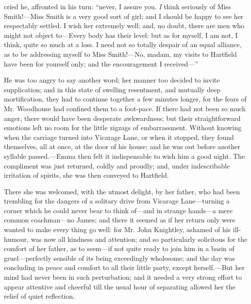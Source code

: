  cried he, affronted in his turn: “never, I assure you. {\em I} think seriously of Miss Smith!---Miss Smith is a very good sort of girl; and I should be happy to see her respectably settled. I wish her extremely well: and, no doubt, there are men who might not object to---Every body has their level: but as for myself, I am not, I think, quite so much at a loss. I need not so totally despair of an equal alliance, as to be addressing myself to Miss Smith!---No, madam, my visits to Hartfield have been for yourself only; and the encouragement I received---”


He was too angry to say another word; her manner too decided to invite supplication; and in this state of swelling resentment, and mutually deep mortification, they had to continue together a few minutes longer, for the fears of Mr. Woodhouse had confined them to a foot-pace. If there had not been so much anger, there would have been desperate awkwardness; but their straightforward emotions left no room for the little zigzags of embarrassment. Without knowing when the carriage turned into Vicarage Lane, or when it stopped, they found themselves, all at once, at the door of his house; and he was out before another syllable passed.---Emma then felt it indispensable to wish him a good night. The compliment was just returned, coldly and proudly; and, under indescribable irritation of spirits, she was then conveyed to Hartfield.

There she was welcomed, with the utmost delight, by her father, who had been trembling for the dangers of a solitary drive from Vicarage Lane---turning a corner which he could never bear to think of---and in strange hands---a mere common coachman---no James; and there it seemed as if her return only were wanted to make every thing go well: for Mr. John Knightley, ashamed of his ill-humour, was now all kindness and attention; and so particularly solicitous for the comfort of her father, as to seem---if not quite ready to join him in a basin of gruel---perfectly sensible of its being exceedingly wholesome; and the day was concluding in peace and comfort to all their little party, except herself.---But her mind had never been in such perturbation; and it needed a very strong effort to appear attentive and cheerful till the usual hour of separating allowed her the relief of quiet reflection.

